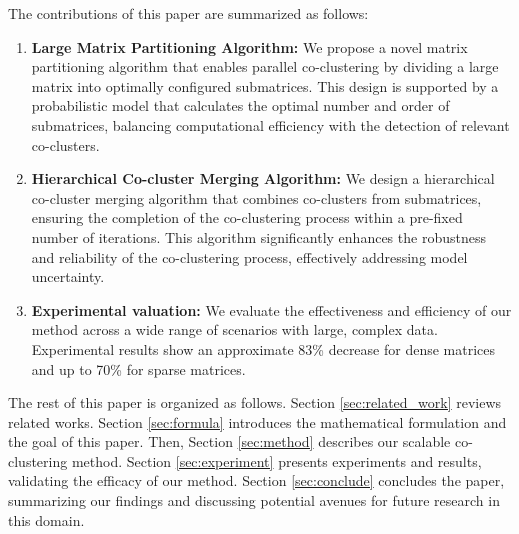 The contributions of this paper are summarized as follows:
\begin{enumerate}
    \item \textbf{Large Matrix Partitioning Algorithm:}
        We propose a novel matrix partitioning algorithm that enables parallel co-clustering by dividing a large matrix into optimally configured submatrices. This design is supported by a probabilistic model that calculates the optimal number and order of submatrices, balancing computational efficiency with the detection of relevant co-clusters.
    \item \textbf{Hierarchical Co-cluster Merging Algorithm:}
          We design a hierarchical co-cluster merging algorithm that combines co-clusters from submatrices, ensuring the completion of the co-clustering process within a pre-fixed number of iterations. This algorithm significantly enhances the robustness and reliability of the co-clustering process, effectively addressing model uncertainty.
    \item \textbf{Experimental valuation:}
          We evaluate the effectiveness and efficiency of our method across a wide range of scenarios with large, complex data. Experimental results show an approximate 83\% decrease for dense matrices and up to 70\% for sparse matrices.
\end{enumerate}

The rest of this paper is organized as follows. Section \ref{sec:related_work} reviews related works. Section \ref{sec:formula} introduces the mathematical formulation and the goal of this paper. Then, Section \ref{sec:method} describes our scalable co-clustering method. Section \ref{sec:experiment} presents experiments and results, validating the efficacy of our method. Section \ref{sec:conclude} concludes the paper, summarizing our findings and discussing potential avenues for future research in this domain.
